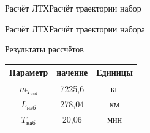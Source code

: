 \begin{frame}{Расчёт ЛТХ}{Расчёт траектории набор}
    \begin{minipage}[c]{0.45\textwidth}
    \end{minipage}
    \begin{minipage}[c]{0.45\textwidth}
    \end{minipage}
\end{frame}
 
\begin{frame}{Расчёт ЛТХ}{Расчёт траектории набора}
    \begin{block}{Результаты рассчётов}
    \begin{table}
        \begin{tabular}{|c|c|c|}
            \hline
            Параметр&  начение & Единицы  \\ \hline
            $m_{T_{\text{наб}}}$& 7225,6 &кг \\ \hline
            $L_\text{наб}$& 278,04 &км \\ \hline
            $T_\text{наб}$& 20,06 & мин\\ \hline
        \end{tabular}
    \end{table}
    \end{block}
\end{frame}

